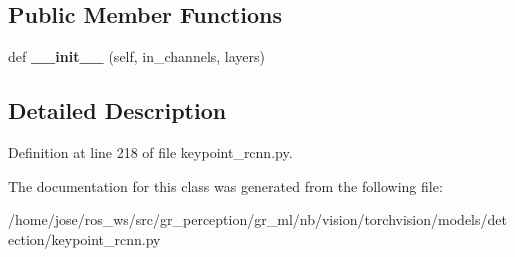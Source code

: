 \subsection*{Public Member Functions}
\begin{DoxyCompactItemize}
\item 
\mbox{\label{classtorchvision_1_1models_1_1detection_1_1keypoint__rcnn_1_1KeypointRCNNHeads_a52f629bc9d0266aae816dddec15ed293}} 
def {\bfseries \+\_\+\+\_\+init\+\_\+\+\_\+} (self, in\+\_\+channels, layers)
\end{DoxyCompactItemize}


\subsection{Detailed Description}


Definition at line 218 of file keypoint\+\_\+rcnn.\+py.



The documentation for this class was generated from the following file\+:\begin{DoxyCompactItemize}
\item 
/home/jose/ros\+\_\+ws/src/gr\+\_\+perception/gr\+\_\+ml/nb/vision/torchvision/models/detection/keypoint\+\_\+rcnn.\+py\end{DoxyCompactItemize}
